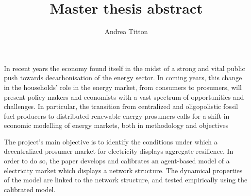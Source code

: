 \documentclass[american]{scrartcl}
\title{
        Master thesis abstract
    }
\author{Andrea Titton}
\begin{document}
\maketitle

In recent years the economy found itself in the midst of a strong and vital public push towards decarbonisation of the energy sector. In coming years, this change in the households' role in the energy market, from consumers to prosumers, will present policy makers and economists with a vast spectrum of opportunities and challenges. In particular, the transition from centralized and oligopolistic fossil fuel producers to distributed renewable energy prosumers calls for a shift in economic modelling of energy markets, both in methodology and objectives

The project's main objective is to identify the conditions under which a decentralized prosumer market for electricity displays aggregate resilience. In order to do so, the paper develops and calibrates an agent-based model of a electricity market which displays a network structure. The dynamical properties of the model are linked to the network structure, and tested empirically using the calibrated model.
\end{document}
